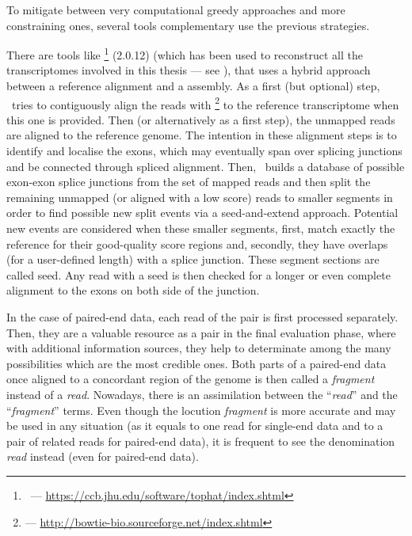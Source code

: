 To mitigate between very computational greedy approaches and more constraining
ones, several tools complementary use the previous strategies.

There are tools like \toph\footnote{\toph\ ---
\href{https://ccb.jhu.edu/software/tophat/index.shtml}
{https://ccb.jhu.edu/software/tophat/index.shtml}} (2.0.12) 
(which has been used to reconstruct all the
transcriptomes involved in this thesis --- see ),
that uses a hybrid approach between a reference alignment and a 
assembly. As a first (but optional) step, \toph\ tries to contiguously
align the reads with \footnote{ ---
\href{http://bowtie-bio.sourceforge.net/index.shtml}%
{http://bowtie-bio.sourceforge.net/index.shtml}} 
to the reference transcriptome when this one is provided. Then
(or alternatively as a first step), the unmapped reads are aligned to the
reference genome. The intention in these alignment steps is to identify and
localise the exons, which may eventually span over splicing junctions and be
connected through spliced alignment. Then, \toph\ builds a database of
possible exon-exon splice junctions from the set of mapped reads and then split
the remaining unmapped (or aligned with a low score) reads to smaller segments
in order to find
possible new split events via a seed-and-extend approach. Potential new events
are considered when these smaller segments, first, match exactly the reference
for their good-quality score regions and, secondly, they have overlaps
(for a user-defined length) with a splice junction. These segment sections are
called seed. Any read with a seed is then checked for a longer or even complete
alignment to the exons on both side of the junction.

In the case of paired-end data, each read of the pair is first processed
separately. Then, they are a valuable resource as a pair in the final evaluation
phase, where with additional
information sources, they help to determinate among the many possibilities which
are the most credible ones. Both parts of a paired-end data once aligned to a
concordant region of the genome is then called a \emph{fragment} instead of a
\emph{read}. Nowadays, there is an assimilation between the \enquote{\emph{read}}
and the \enquote{\emph{fragment}} terms. Even though the locution \emph{fragment}
is more accurate and may be used in any situation (as it equals to one read for
single-end data and to a pair of related reads for paired-end data), it is
frequent to see the denomination \emph{read} instead (even for paired-end data).

